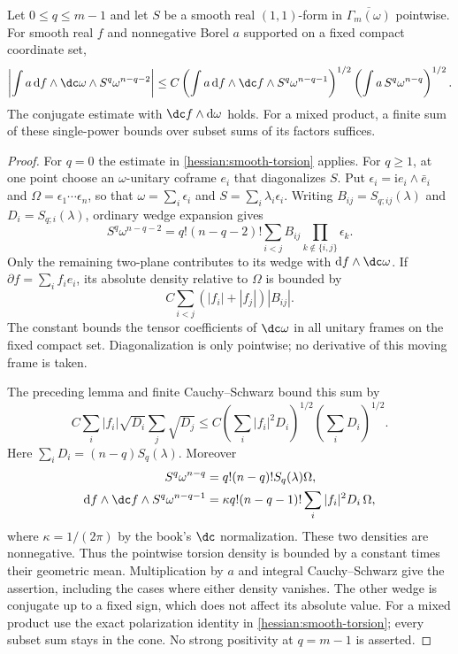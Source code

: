 \begin{lemma}\label{draft623:top-torsion}
Let $0\leq q\leq m-1$ and let $S$ be a smooth real $(1,1)$-form
in $\overline{\Gamma_m(\omega)}$ pointwise. For smooth real $f$
and nonnegative Borel $a$ supported on a fixed compact coordinate set,
\[
 \left|\int a\,\mathrm df\wedge\dc\omega\wedge S^q\omega^{n-q-2}\right|
 \leq C\left(\int a\,\mathrm df\wedge\dc f\wedge
                           S^q\omega^{n-q-1}\right)^{1/2}
          \left(\int a\,S^q\omega^{n-q}\right)^{1/2}.
\]
The conjugate estimate with $\dc f\wedge\mathrm d\omega$ holds.
For a mixed product, a finite sum of these single-power bounds over
subset sums of its factors suffices.
\end{lemma}
\begin{proof}
For $q=0$ the estimate in \cref{hessian:smooth-torsion} applies.
For $q\geq1$, at one point choose an $\omega$-unitary coframe $e_i$
that diagonalizes $S$. Put $\epsilon_i=\mathrm i e_i\wedge\bar e_i$
and $\Omega=\epsilon_1\cdots\epsilon_n$, so that
$\omega=\sum_i\epsilon_i$ and $S=\sum_i\lambda_i\epsilon_i$.
Writing $B_{ij}=S_{q;ij}(\lambda)$ and $D_i=S_{q;i}(\lambda)$,
ordinary wedge expansion gives
\[
 S^q\omega^{n-q-2}
 =q!(n-q-2)!\sum_{i<j}B_{ij}
                           \prod_{k\notin\{i,j\}}\epsilon_k.
\]
Only the remaining two-plane contributes to its wedge with
$\mathrm df\wedge\dc\omega$. If $\partial f=\sum_i f_i e_i$,
its absolute density relative to $\Omega$ is bounded by
\[
 C\sum_{i<j}(|f_i|+|f_j|)|B_{ij}|.
\]
The constant bounds the tensor coefficients of $\dc\omega$ in all
unitary frames on the fixed compact set. Diagonalization is only
pointwise; no derivative of this moving frame is taken.

The preceding lemma and finite Cauchy--Schwarz bound this sum by
\[
 C\sum_i|f_i|\sqrt{D_i}\sum_j\sqrt{D_j}
 \leq C\left(\sum_i|f_i|^2D_i\right)^{1/2}
          \left(\sum_iD_i\right)^{1/2}.
\]
Here $\sum_iD_i=(n-q)S_q(\lambda)$. Moreover
\[
 \begin{aligned}
 S^q\omega^{n-q}&=q!(n-q)!S_q(\lambda)\Omega,\\
 \mathrm df\wedge\dc f\wedge S^q\omega^{n-q-1}
   &=\kappa q!(n-q-1)!\sum_i|f_i|^2D_i\,\Omega,
 \end{aligned}
\]
where $\kappa=1/(2\pi)$ by the book's $\dc$ normalization.
These two densities are nonnegative. Thus the pointwise torsion
density is bounded by a constant times their geometric mean.
Multiplication by $a$ and integral Cauchy--Schwarz give the assertion,
including the cases where either density vanishes. The other wedge
is conjugate up to a fixed sign, which does not affect its absolute
value. For a mixed product use the exact polarization identity in
\cref{hessian:smooth-torsion}; every subset sum stays in the cone.
No strong positivity at $q=m-1$ is asserted.
\end{proof}

